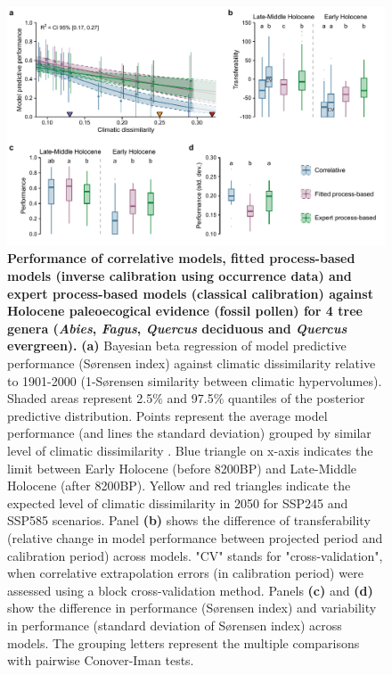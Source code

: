 \documentclass[pdflatex, sn-nature]{sn-jnl}%
\begin{document}
\begin{itemize}
\begin{figure}[ht]
\centering
\hspace*{-0.8in}
\includegraphics[scale=0.9]{past_performance.pdf}
\caption{\textbf{Performance of correlative models, fitted process-based models (inverse calibration using occurrence data) and expert process-based models (classical calibration) against Holocene paleoecogical evidence (fossil pollen) for 4 tree genera (\emph{Abies}, \emph{Fagus}, \emph{Quercus} deciduous and \emph{Quercus} evergreen).} \textbf{(a)} Bayesian beta regression of model predictive performance (Sørensen index) against climatic dissimilarity relative to 1901-2000 (1-Sørensen similarity between climatic hypervolumes). Shaded areas represent 2.5\% and 97.5\% quantiles of the posterior predictive distribution. Points represent the average model performance (and lines the standard deviation) grouped by similar level of climatic dissimilarity . Blue triangle on x-axis indicates the limit between Early Holocene (before 8200BP) and Late-Middle Holocene (after 8200BP). Yellow and red triangles indicate the expected level of climatic dissimilarity in 2050 for SSP245 and SSP585 scenarios. Panel \textbf{(b)} shows the difference of transferability (relative change in model performance between projected period and calibration period) across models. "CV" stands for "cross-validation", when correlative extrapolation errors (in calibration period) were assessed using a block cross-validation method. Panels \textbf{(c)} and \textbf{(d)} show the difference in performance (Sørensen index) and variability in performance (standard deviation of Sørensen index) across models. The grouping letters represent the multiple comparisons with pairwise Conover-Iman tests. }\label{past_performance}
\end{figure}


\end{itemize}
\end{document}
